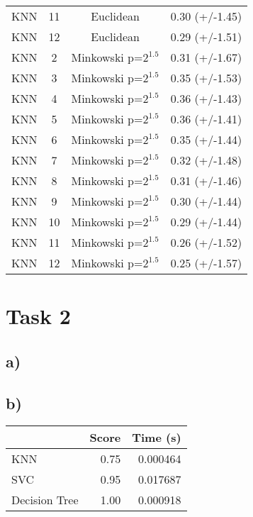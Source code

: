 \documentclass{article}
\begin{document}
\begin{tabular}{cccc}
            KNN &         11 &              Euclidean &  0.30 (+/-1.45) \\
            KNN &         12 &              Euclidean &  0.29 (+/-1.51) \\
            KNN &          2 &  Minkowski p=$2^{1.5}$ &  0.31 (+/-1.67) \\
            KNN &          3 &  Minkowski p=$2^{1.5}$ &  0.35 (+/-1.53) \\
            KNN &          4 &  Minkowski p=$2^{1.5}$ &  0.36 (+/-1.43) \\
            KNN &          5 &  Minkowski p=$2^{1.5}$ &  0.36 (+/-1.41) \\
            KNN &          6 &  Minkowski p=$2^{1.5}$ &  0.35 (+/-1.44) \\
            KNN &          7 &  Minkowski p=$2^{1.5}$ &  0.32 (+/-1.48) \\
            KNN &          8 &  Minkowski p=$2^{1.5}$ &  0.31 (+/-1.46) \\
            KNN &          9 &  Minkowski p=$2^{1.5}$ &  0.30 (+/-1.44) \\
            KNN &         10 &  Minkowski p=$2^{1.5}$ &  0.29 (+/-1.44) \\
            KNN &         11 &  Minkowski p=$2^{1.5}$ &  0.26 (+/-1.52) \\
            KNN &         12 &  Minkowski p=$2^{1.5}$ &  0.25 (+/-1.57) \\
            \bottomrule
          \end{tabular}
      \section{Task 2}
          \subsection{a)}
          \subsection{b)}
            \begin{tabular}{lrr}
              \toprule
              {} &  Score &  Time (s) \\
              \midrule
              KNN           &   0.75 &  0.000464 \\
              SVC           &   0.95 &  0.017687 \\
              Decision Tree &   1.00 &  0.000918 \\
              \bottomrule
            \end{tabular}
\end{document}

